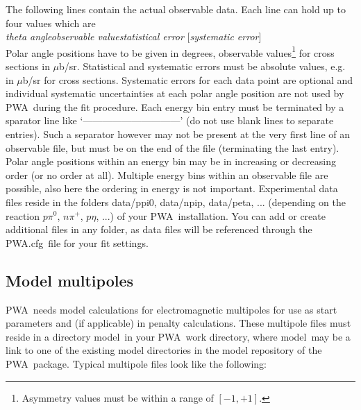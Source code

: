 \documentclass[a4paper,10pt]{article}
\def\PWA{\ttfamily PWA\rmfamily\ }
\def\bl{\phantom{0}}
\def\tt{\ttfamily}
\def\rm{\rmfamily}
\begin{document}
The following lines contain the actual observable data. Each line can hold up to four values which are\\
\tt\textit{theta angle\bl\bl\bl\bl observable value\bl\bl\bl\bl  statistical error\bl\bl\bl\bl}
[\textit{systematic error}]\rm\\
Polar angle positions have to be given in degrees, observable values\footnote{Asymmetry values must be within a range
of $[-1,+1]$.} for cross sections in $\mu$b/sr. Statistical and systematic
errors must be absolute values, e.g. in $\mu$b/sr for cross sections.
Systematic errors for each data point are optional and individual systematic uncertainties at each polar angle position
are not used by \PWA during the fit procedure.
Each energy bin entry must be terminated by a sparator line like
`\tt------------------------------\rm' (do not use blank lines to separate entries).
Such a separator however may not be present at the very first line of an observable file, but must be on the end of the file
(terminating the last entry).
Polar angle positions within an energy bin may be in increasing or decreasing order (or no order at all).
Multiple energy bins within an observable file are possible, also here the ordering in energy is not important.
Experimental data files reside in the folders \tt data/ppi0\rm, \tt data/npip\rm, 
\tt data/peta\rm, ... (depending on the reaction $p \pi^0$, $n\pi^+$, $p\eta$, ...) of your \PWA installation.
You can add or create additional files in any folder, as data files will be referenced through the 
\tt PWA.cfg\rm\ file for your fit settings.

\subsection{Model multipoles}\label{sec_models}

\PWA needs model calculations for electromagnetic multipoles for use as start parameters and (if applicable) in penalty calculations.
These multipole files must reside in a directory \tt model\rm\ in your \PWA work directory, where
\tt model\rm\ may be a link to one of the existing model directories in the model repository of the \PWA package.
Typical multipole files look like the following:\\
\end{document}
